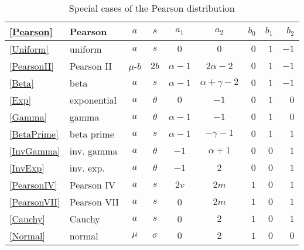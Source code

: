 \begin{table*}[tb]
\begin{center}
\caption[Pearson distribution -- Special cases]{Special cases of the Pearson distribution}
\label{PearsonTable2}
{\renewcommand{\arraystretch}{1.25} 
\begin{tabular}{llccccrrr}
\\
\eqref{Pearson}  & Pearson & $a$ & $s$ & $a_1$ & $a_2$  & $b_0$ & $b_1$ & $b_2$ \\
\hline
\eqref{Uniform} 	& uniform 		&  $a$  &  $s$  &  $0$  &  $0$    &     $0$    & $1$ & $-1$  \checked\\
\eqref{PearsonII} 	& Pearson II 	&  $\mu$-$b$  &  $2b$  &  $\alpha-1$  &  $2\alpha-2$    &    $0$   & $1$ &$-1$ \\
\eqref{Beta}     		& {beta} 		&  $a$  &  $s$  &  $\alpha-1$  &  $\alpha+\gamma-2$  &  $0$    &    $1$    &  $-1$  \checked \\
\eqref{Exp} 		& exponential 	&  $a$  &  $\theta$  &  $0$  &  $-1$    &    $0$    & $1$ & $0$ \checked \\
\eqref{Gamma} 	& gamma 		&  $a$  &  $\theta$  &  $\alpha-1$  &  $-1$    &    $0$    & $1$ & $0$ \checked \\
\eqref{BetaPrime} 	& {beta prime} 	&  $a$  &  $s$  &  $\alpha-1$  &  $-\gamma-1$  &  $0$    &    $1$    &  $1$\\
\eqref{InvGamma} 	& inv. gamma 	&  $a$  &  $\theta$  &  $-1$  &  $\alpha+1$  &      $0$    & $0$ & $1$ \checked \\
\eqref{InvExp} 		& inv. exp.&$a$ &  $\theta$  &  $-1$  &  $2$    &     $0$    & $0$ & $1$ \checked \\
\eqref{PearsonIV} 	& {Pearson IV} 	&  $a$  &  $s$  &  $2v$  &  $2m$  &  $1$    &    $0$    & $1$\\
\eqref{PearsonVII} 	& Pearson VII 	&  $a$  &  $s$  &  0  &  $2m$  &  $1$    &    $0$    & $1$ \checked\\
\eqref{Cauchy} 	& Cauchy 		&  $a$  &  $s$  &  0  &  $2$  &    $1$    &    $0$    & $1$  \checked \\
\eqref{Normal} 		& normal 		&$\mu$&  $\sigma$  &  $0$  &  $2$    &    $1$    &    $0$    & $0$ \\
\end{tabular} 
}
\end{center}
\end{table*}

